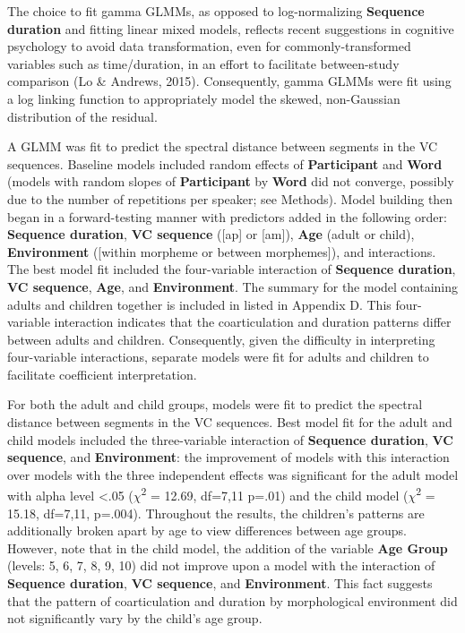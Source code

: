 \documentclass[
]{article}
\begin{document}
The choice to fit gamma GLMMs, as opposed to log-normalizing \textbf{Sequence duration} and fitting linear mixed models, reflects recent suggestions in cognitive psychology to avoid data transformation, even for commonly-transformed variables such as time/duration, in an effort to facilitate between-study comparison (Lo \& Andrews, 2015). Consequently, gamma GLMMs were fit using a log linking function to appropriately model the skewed, non-Gaussian distribution of the residual.

A GLMM was fit to predict the spectral distance between segments in the VC sequences. Baseline models included random effects of \textbf{Participant} and \textbf{Word} (models with random slopes of \textbf{Participant} by \textbf{Word} did not converge, possibly due to the number of repetitions per speaker; see Methods). Model building then began in a forward-testing manner with predictors added in the following order: \textbf{Sequence duration}, \textbf{VC sequence} ({[}ap{]} or {[}am{]}), \textbf{Age} (adult or child), \textbf{Environment} ({[}within morpheme or between morphemes{]}), and interactions. The best model fit included the four-variable interaction of \textbf{Sequence duration}, \textbf{VC sequence}, \textbf{Age}, and \textbf{Environment}. The summary for the model containing adults and children together is included in listed in Appendix D. This four-variable interaction indicates that the coarticulation and duration patterns differ between adults and children. Consequently, given the difficulty in interpreting four-variable interactions, separate models were fit for adults and children to facilitate coefficient interpretation.

For both the adult and child groups, models were fit to predict the spectral distance between segments in the VC sequences. Best model fit for the adult and child models included the three-variable interaction of \textbf{Sequence duration}, \textbf{VC sequence}, and \textbf{Environment}: the improvement of models with this interaction over models with the three independent effects was significant for the adult model with alpha level \textless.05 (\(\chi\)\textsuperscript{2} = 12.69, df=7,11 p=.01) and the child model (\(\chi\)\textsuperscript{2} = 15.18, df=7,11, p=.004). Throughout the results, the children's patterns are additionally broken apart by age to view differences between age groups. However, note that in the child model, the addition of the variable \textbf{Age Group} (levels: 5, 6, 7, 8, 9, 10) did not improve upon a model with the interaction of \textbf{Sequence duration}, \textbf{VC sequence}, and \textbf{Environment}. This fact suggests that the pattern of coarticulation and duration by morphological environment did not significantly vary by the child's age group.
\end{document}
